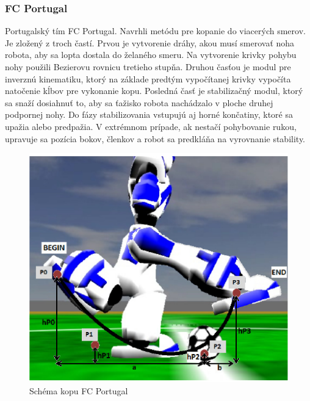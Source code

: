 \subsubsection{FC Portugal} \label{fc_portugal}

Portugalský tím FC Portugal\cite{fc_portugal}.
Navrhli metódu pre kopanie do viacerých smerov. Je zložený z troch častí. Prvou je vytvorenie dráhy, akou musí smerovať noha robota, aby sa lopta dostala do želaného smeru. Na vytvorenie krivky pohybu nohy použili Bezierovu rovnicu tretieho stupňa. Druhou časťou je modul pre inverznú kinematiku, ktorý na základe predtým vypočítanej krivky vypočíta natočenie kĺbov pre vykonanie kopu. Posledná časť je stabilizačný modul, ktorý sa snaží dosiahnuť to, aby sa ťažisko robota nachádzalo v ploche druhej podpornej nohy. Do fázy stabilizovania vstupujú aj horné končatiny, ktoré sa upažia alebo predpažia. V extrémnom prípade, ak nestačí pohybovanie rukou, upravuje sa pozícia bokov, členkov a robot sa predkláňa na vyrovnanie stability. %

\begin{figure}[H]
	\center
	\includegraphics[scale=1]{./data/kick_arch_fc_portugal}
	\caption{Schéma kopu FC Portugal \cite{fc_portugal}}
	\label{pic_kick_arch_fc_portugal}
\end{figure}